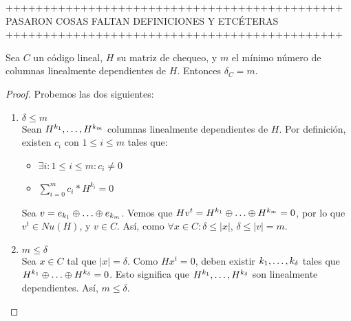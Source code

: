 +++++++++++++++++++++++++++++++++++++++++++++\\
PASARON COSAS FALTAN DEFINICIONES Y ETCÉTERAS\\
+++++++++++++++++++++++++++++++++++++++++++++\\

\begin{theorem}
Sea $C$ un código lineal, $H$ su matriz de chequeo, y $m$ el mínimo número de columnas linealmente dependientes de $H$. Entonces $\delta_C = m$.
\end{theorem}

\begin{proof}
Probemos las dos siguientes:
\begin{enumerate}
\item $\delta \le m$\\
Sean $H^{k_1}, \mathellipsis, H^{k_m}$ columnas linealmente dependientes de $H$. Por definición, existen $c_i$ con $1 \le i \le m$ tales que:
\begin{itemize}
    \item $\exists i : 1 \le i \le m : c_i \neq 0$
    \item $\sum_{i=0}^m c_i * H^{k_i} = 0$
\end{itemize}
Sea $v = e_{k_1} \oplus \mathellipsis \oplus e_{k_m}$. Vemos que $Hv^t = H^{k_1} \oplus \mathellipsis \oplus H^{k_m} = 0$, por lo que $v^t \in Nu(H)$, y $v \in C$. Así, como $\forall x \in C : \delta \le \left| x \right|$, $\delta \le \left| v \right| = m$.

\item $m \le \delta$\\
Sea $x \in C$ tal que $\left| x \right| = \delta$. Como $Hx^t = 0$, deben existir $k_1, \mathellipsis, k_\delta$ tales que $H^{k_1} \oplus \mathellipsis \oplus H^{k_\delta} = 0$. Esto significa que $H^{k_1}, \mathellipsis, H^{k_\delta}$ son linealmente dependientes. Así, $m \le \delta$.
\end{enumerate} 
\end{proof}

